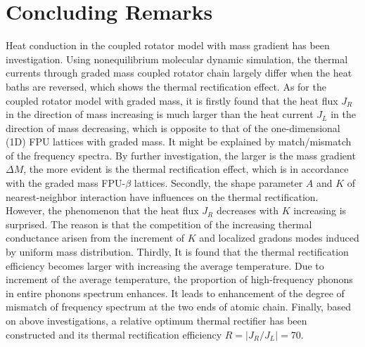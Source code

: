 \documentclass[pra,preprint,superscriptaddress,showkeys,showpacs]{revtex4}
\begin{document}
\section{Concluding Remarks}
\indent Heat conduction in the coupled rotator model with mass
gradient has been investigation. Using nonequilibrium molecular
dynamic simulation, the thermal currents through graded mass coupled
rotator chain largely differ when
 the heat baths are reversed, which shows the thermal rectification effect.  As for
the coupled rotator model with graded mass, it is firstly found
  that the heat flux $J_{R}$ in the direction of mass increasing is much larger than the
 heat current $J_{L}$ in the direction of mass decreasing, which is opposite to that of the one-dimensional (1D) FPU lattices with graded mass\cite{a19}. It might be explained by match/mismatch of
 the frequency spectra. By further investigation, the larger is the mass gradient $\Delta M$,
 the more evident is the thermal rectification effect, which is in accordance with the graded mass FPU-$\beta$ lattices\cite{a19,a20}.
 Secondly, the shape parameter $A$ and $K$ of nearest-neighbor interaction have influences on the thermal
 rectification. However, the phenomenon that the heat flux $J_{R}$ decreases with $K$ increasing is
 surprised. The reason is that the competition of the increasing
 thermal conductance arisen from the increment of $K$ and localized
 gradons modes induced by uniform mass distribution. Thirdly, It is found that
 the thermal rectification efficiency becomes larger with increasing the average temperature. Due to increment of the average temperature, the proportion of high-frequency phonons in entire
 phonons spectrum enhances. It leads to enhancement of the degree of mismatch of frequency spectrum at the two ends of
 atomic chain. Finally, based on above investigations, a relative optimum
thermal rectifier has been constructed and its thermal
rectification efficiency $R=\mid J_{R}/J_{L}\mid=70$.\\
\end{document}

